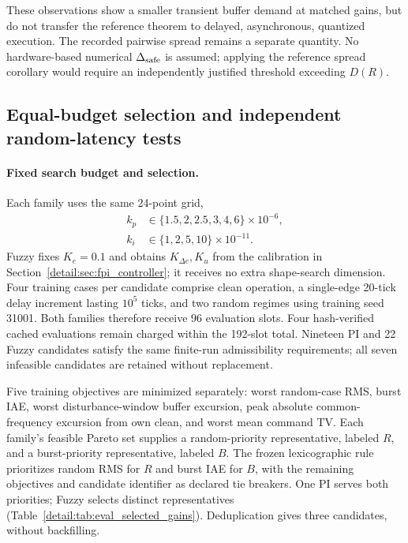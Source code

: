 These observations show a smaller transient buffer demand at matched
gains, but do not transfer the reference theorem
to delayed, asynchronous, quantized execution. The recorded pairwise
spread remains a separate quantity. No hardware-based numerical
$\Delta_{\rm safe}$ is assumed; applying the reference spread corollary
would require an independently justified threshold exceeding $D(R)$.

\subsection{Equal-budget selection and independent random-latency tests}
\label{detail:subsec:eval_random}

\paragraph{Fixed search budget and selection.}
Each family uses the same 24-point grid,
\begin{align}
 k_p&\in\{1.5,2,2.5,3,4,6\}\times10^{-6},\nonumber\\
 k_i&\in\{1,2,5,10\}\times10^{-11}.
 \label{detail:eq:eval_gain_grid}
\end{align}
Fuzzy fixes $K_e=0.1$ and obtains $K_{\Delta e},K_u$ from the
calibration in Section~\ref{detail:sec:fpi_controller}; it receives no extra
shape-search dimension. Four training cases per candidate comprise
clean operation, a single-edge 20-tick delay increment lasting
$10^5$ ticks, and two random regimes using training seed 31001.
Both families therefore receive 96 evaluation slots. Four hash-verified
cached evaluations remain charged within the 192-slot total.
Nineteen PI and 22 Fuzzy candidates satisfy the same finite-run
admissibility requirements; all seven infeasible candidates are
retained without replacement.

Five training objectives are minimized separately: worst random-case
RMS, burst IAE, worst disturbance-window buffer excursion, peak absolute
common-frequency excursion from own clean, and worst mean command TV.
Each family's feasible Pareto set supplies a random-priority
representative, labeled $R$, and a burst-priority representative,
labeled $B$. The frozen lexicographic rule prioritizes random RMS for
$R$ and burst IAE for $B$, with the remaining objectives and candidate
identifier as declared tie breakers. One PI serves both priorities;
Fuzzy selects distinct representatives (Table~\ref{detail:tab:eval_selected_gains}).
Deduplication gives three candidates, without backfilling.

